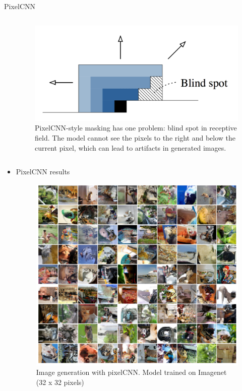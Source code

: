 \begin{frame}[allowframebreaks]{PixelCNN}
\begin{columns}
\begin{column}{0.5\textwidth}
        \end{column}
        \begin{column}{0.5\textwidth}
            \begin{figure}
                \centering
                \includegraphics[width=1.1\textwidth,keepaspectratio]{images/autoregressive/pixelcnn-blindspot.png}
                \caption*{PixelCNN-style masking has one problem: blind spot in receptive field. The model cannot see the pixels to the right and below the current pixel, which can lead to artifacts in generated images.}
            \end{figure}
        \end{column}
    \end{columns}

\framebreak

\begin{itemize}
    \item PixelCNN results
        \begin{figure}
        \centering
        \includegraphics[height=0.65\textheight, width=\textwidth, keepaspectratio]{images/autoregressive/pixelcnn_results.png}
        \caption*{Image generation with pixelCNN. Model trained on Imagenet (32 x 32 pixels)}
    \end{figure}
\end{itemize}
\end{frame}